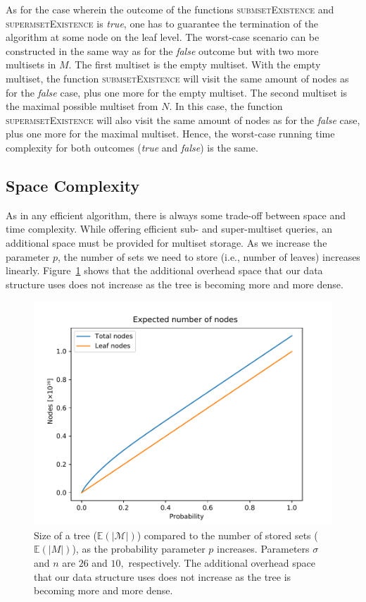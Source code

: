 \documentclass[algorithms,article,accept,pdftex,moreauthors]{Definitions/mdpi}
\begin{document}
As for the case wherein the outcome of the functions \textsc{submsetExistence} and 
\textsc{supermsetExistence} is \emph{true}, one has to guarantee the termination 
of the algorithm at some node on the leaf level. The worst-case scenario can be 
constructed in the same way as for the \emph{false} outcome but with two more 
multisets in $M.$ The first multiset is the empty multiset. With the empty multiset, 
the function \textsc{submsetExistence} will visit the same amount of nodes as for 
the \emph{false} case, plus one more for the empty multiset. The second multiset 
is the maximal possible multiset from $N.$ In this case, the function \textsc{supermsetExistence} 
will also visit the same amount of nodes as for the \emph{false} case, plus one more 
for the maximal multiset. Hence, the worst-case running time complexity for both 
outcomes (\emph{true} and \emph{false}) is the same.

\subsection{Space Complexity}\label{s:spacecomplexity}
As in any efficient algorithm, there is always some trade-off between space and 
time complexity. While offering efficient sub- and super-multiset queries, an 
additional space must be provided for multiset storage. 
As we increase the parameter $p$, the number of sets we need to store (i.e., number of leaves) increases linearly. Figure~\ref{f:exp-nodes} shows that the additional overhead space that our data structure uses does not increase as the tree is becoming more and more dense.


\begin{figure}[H]
\centering
\includegraphics[width=.64\textwidth, keepaspectratio]{exp-nodes-on-probab-1.pdf}
\caption{Size %
 of a tree ($\mathbb{E}(|\mathcal{M}|)$) compared to the number of stored sets ($\mathbb{E}(|M|)$), as the probability parameter $p$ increases.
Parameters 
$\sigma$ and $n$ are $26$ and $10,$ respectively.
The additional overhead space that our data structure uses does not increase as the tree is becoming more and more dense.
}
\label{f:exp-nodes}
\end{figure}
\end{document}

